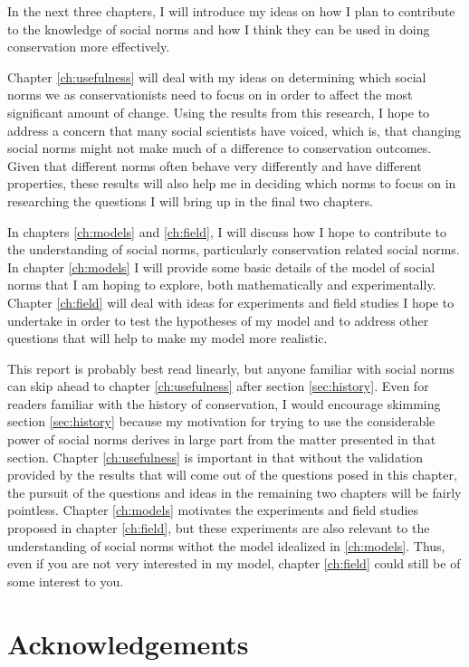 \documentclass{report}
\begin{document}
In the next three chapters, I will introduce my ideas on how I plan to contribute to the knowledge of social norms and how I think they can be used in doing conservation more effectively. 

Chapter \ref{ch:usefulness} will deal with my ideas on determining which social norms we as conservationists need to focus on in order to affect the most significant amount of change. Using the results from this research, I hope to address a concern that many social scientists have voiced, which is, that changing social norms might not make much of a difference to conservation outcomes. Given that different norms often behave very differently and have different properties, these results will also help me in deciding which norms to focus on in researching the questions I will bring up in the final two chapters.

In chapters \ref{ch:models} and \ref{ch:field}, I will discuss how I hope to contribute to the understanding of social norms, particularly conservation related social norms. In chapter \ref{ch:models} I will provide some basic details of the model of social norms that I am hoping to explore, both mathematically and experimentally. Chapter \ref{ch:field} will deal with ideas for experiments and field studies I hope to undertake in order to test the hypotheses of my model and to address other questions that will help to make my model more realistic.

This report is probably best read linearly, but anyone familiar with social norms can skip ahead to chapter \ref{ch:usefulness} after section \ref{sec:history}. Even for readers familiar with the history of conservation, I would encourage skimming section \ref{sec:history} because my motivation for trying to use the considerable power of social norms derives in large part from the matter presented in that section. Chapter \ref{ch:usefulness} is important in that without the validation provided by the results that will come out of the questions posed in this chapter, the pursuit of the questions and ideas in the remaining two chapters will be fairly pointless. Chapter \ref{ch:models} motivates the experiments and field studies proposed in chapter \ref{ch:field}, but these experiments are also relevant to the understanding of social norms withot the model idealized in \ref{ch:models}. Thus, even if you are not very interested in my model, chapter \ref{ch:field} could still be of some interest to you.

\chapter*{Acknowledgements}
\end{document}
